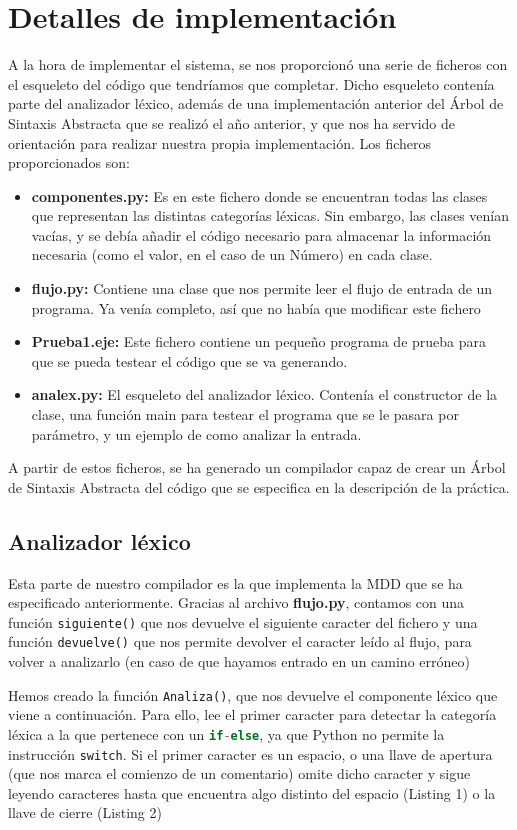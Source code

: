 \documentclass[11pt]{article}
\begin{document}
\section{Detalles de implementación}
A la hora de implementar el sistema, se nos proporcionó una serie de ficheros con el esqueleto del código que tendríamos que completar. Dicho esqueleto contenía parte del analizador léxico, además de una implementación anterior del Árbol de Sintaxis Abstracta que se realizó el año anterior, y que nos ha servido de orientación para realizar nuestra propia implementación. Los ficheros proporcionados son: 
\begin{itemize}
	\item \textbf{componentes.py: } Es en este fichero donde se encuentran todas las clases que representan las distintas categorías léxicas. Sin embargo, las clases venían vacías, y se debía añadir el código necesario para almacenar la información necesaria (como el valor, en el caso de un Número) en cada clase.
	\item \textbf{flujo.py: } Contiene una clase que nos permite leer el flujo de entrada de un programa. Ya venía completo, así que no había que modificar este fichero
	\item \textbf{Prueba1.eje: } Este fichero contiene un pequeño programa de prueba para que se pueda testear el código que se va generando. 
	\item \textbf{analex.py: } El esqueleto del analizador léxico. Contenía el constructor de la clase, una función main para testear el programa que se le pasara por parámetro, y un ejemplo de como analizar la entrada.
\end{itemize}
A partir de estos ficheros, se ha generado un compilador capaz de crear un Árbol de Sintaxis Abstracta del código que se especifica en la descripción de la práctica.

\subsection{Analizador léxico}
Esta parte de nuestro compilador es la que implementa la MDD que se ha especificado anteriormente. Gracias al archivo \textbf{flujo.py}, contamos con una función \lstinline[language=Python]{siguiente()} que nos devuelve el siguiente caracter del fichero y una función \lstinline[language=Python]{devuelve()} que nos permite devolver el caracter leído al flujo, para volver a analizarlo (en caso de que hayamos entrado en un camino erróneo)

Hemos creado la función \lstinline[language=Python]{Analiza()}, que nos devuelve el componente léxico que viene a continuación. Para ello, lee el primer caracter para detectar la categoría léxica a la que pertenece con un \lstinline[language=Python]{if-else}, ya que Python no permite la instrucción \lstinline[language=Python]{switch}. Si el primer caracter es un espacio, o una llave de apertura (que nos marca el comienzo de un comentario) omite dicho caracter y sigue leyendo caracteres hasta que encuentra algo distinto del espacio (Listing 1) o la llave de cierre (Listing 2)
\end{document}
